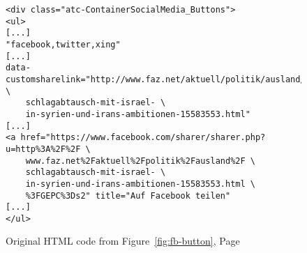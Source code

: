 \begin{figure}
\begin{verbatim}
<div class="atc-ContainerSocialMedia_Buttons">
<ul>
[...]
"facebook,twitter,xing"
[...]
data-customsharelink="http://www.faz.net/aktuell/politik/ausland/ \
	schlagabtausch-mit-israel- \
	in-syrien-und-irans-ambitionen-15583553.html"
[...]
<a href="https://www.facebook.com/sharer/sharer.php?u=http%3A%2F%2F \ 
	www.faz.net%2Faktuell%2Fpolitik%2Fausland%2F \
	schlagabtausch-mit-israel- \
	in-syrien-und-irans-ambitionen-15583553.html \
	%3FGEPC%3Ds2" title="Auf Facebook teilen"
[...]
</ul>
\end{verbatim}
\caption{Original HTML code from Figure~\ref{fig:fb-button}, Page~\pageref{fig:fb-button}}\label{fig:fb-button-html}
\end{figure}
